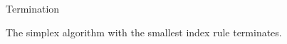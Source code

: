 \begin{frame}{Termination}



  \begin{theorem}
    \label{thr:3}
    The simplex algorithm with the smallest index rule terminates. 
  \end{theorem}

  
  \begin{columns}
    \begin{column}{.5\textwidth}
      
    \end{column}
    \begin{column}{.5\textwidth}
      
    \end{column}       
  \end{columns}
\end{frame}



\begin{frame}{}

  \begin{columns}
    \begin{column}{.5\textwidth}
      
    \end{column}
    \begin{column}{.5\textwidth}
      
    \end{column}       
  \end{columns}
\end{frame}


\begin{frame}{}

  \begin{columns}
    \begin{column}{.5\textwidth}
      
    \end{column}
    \begin{column}{.5\textwidth}
      
    \end{column}       
  \end{columns}
\end{frame}




\begin{frame}{}

  \begin{columns}
    \begin{column}{.5\textwidth}
      
    \end{column}
    \begin{column}{.5\textwidth}
      
    \end{column}       
  \end{columns}
\end{frame}








